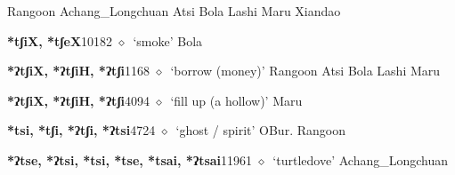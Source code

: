 \begin{list}{}{\leftmargin=1.5em \itemindent=-1.5em}
         Rangoon 
\hspace{1ex}
         Achang\_Longchuan 
\hspace{1ex}
         Atsi 
\hspace{1ex}
         Bola 
\hspace{1ex}
         Lashi 
\hspace{1ex}
         Maru 
\hspace{1ex}
         Xiandao 
  \item {\footnotesize \textbf{*tʃiX, *tʃeX}}{\tiny 10182}
\hspace{1ex}
         $\diamond$~`smoke'
         Bola 
  \item {\footnotesize \textbf{*ʔtʃiX, *ʔtʃiH, *ʔtʃi}}{\tiny 1168}
\hspace{1ex}
         $\diamond$~`borrow (money)'
         Rangoon 
\hspace{1ex}
         Atsi 
\hspace{1ex}
         Bola 
\hspace{1ex}
         Lashi 
\hspace{1ex}
         Maru 
  \item {\footnotesize \textbf{*ʔtʃiX, *ʔtʃiH, *ʔtʃi}}{\tiny 4094}
\hspace{1ex}
         $\diamond$~`fill up (a hollow)'
         Maru 
  \item {\footnotesize \textbf{*tsi, *tʃi, *ʔtʃi, *ʔtsi}}{\tiny 4724}
\hspace{1ex}
         $\diamond$~`ghost / spirit'
         OBur. 
\hspace{1ex}
         Rangoon 
  \item {\footnotesize \textbf{*ʔtse, *ʔtsi, *tsi, *tse, *tsai, *ʔtsai}}{\tiny 11961}
\hspace{1ex}
         $\diamond$~`turtledove'
         Achang\_Longchuan 

\end{list}
